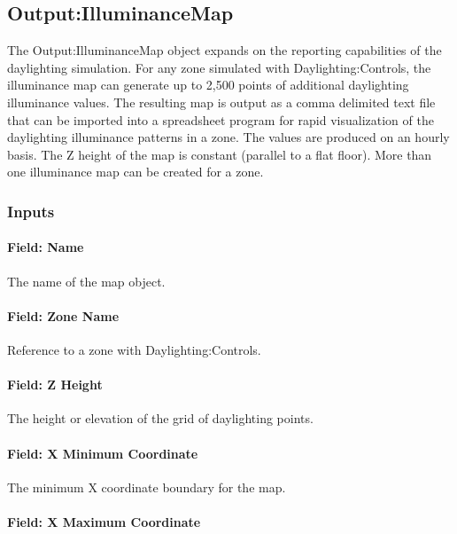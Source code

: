 \subsection{Output:IlluminanceMap}\label{outputilluminancemap}

The Output:IlluminanceMap object expands on the reporting capabilities of the daylighting simulation. For any zone simulated with Daylighting:Controls, the illuminance map can generate up to 2,500 points of additional daylighting illuminance values. The resulting map is output as a comma delimited text file that can be imported into a spreadsheet program for rapid visualization of the daylighting illuminance patterns in a zone. The values are produced on an hourly basis. The Z height of the map is constant (parallel to a flat floor). More than one illuminance map can be created for a zone.

\subsubsection{Inputs}\label{inputs-4-006}

\paragraph{Field: Name}\label{field-name-2-007}

The name of the map object.

\paragraph{Field: Zone Name}\label{field-zone-name-2-000}

Reference to a zone with Daylighting:Controls.

\paragraph{Field: Z Height}\label{field-z-height}

The height or elevation of the grid of daylighting points.

\paragraph{Field: X Minimum Coordinate}\label{field-x-minimum-coordinate}

The minimum X coordinate boundary for the map.

\paragraph{Field: X Maximum Coordinate}\label{field-x-maximum-coordinate}


